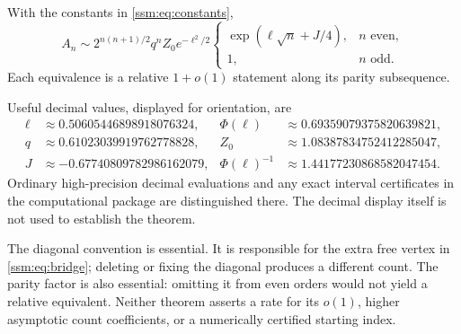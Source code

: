 \begin{theorem}\label{ssm:thm:matrix}
With the constants in \eqref{ssm:eq:constants},
\begin{equation}\label{ssm:eq:matrix}
 A_n\sim 2^{n(n+1)/2}q^n Z_0e^{-\ell^2/2}
 \begin{cases}
 \exp(\ell\sqrt n+J/4),&n\text{ even},\\
 1,&n\text{ odd}.
 \end{cases}
\end{equation}
Each equivalence is a relative $1+o(1)$ statement along its parity subsequence.
\end{theorem}

Useful decimal values, displayed for orientation, are
\[
\begin{array}{rlrl}
 \ell&\approx0.50605446898918076324,&\Phi(\ell)&\approx0.69359079375820639821,\\
 q&\approx0.61023039919762778828,&Z_0&\approx1.08387834752412285047,\\
 J&\approx-0.67740809782986162079,&\Phi(\ell)^{-1}&\approx1.44177230868582047454.
\end{array}
\]
Ordinary high-precision decimal evaluations and any exact interval certificates in the computational package are distinguished there. The decimal display itself is not used to establish the theorem.

The diagonal convention is essential. It is responsible for the extra free vertex in \eqref{ssm:eq:bridge}; deleting or fixing the diagonal produces a different count. The parity factor is also essential: omitting it from even orders would not yield a relative equivalent. Neither theorem asserts a rate for its $o(1)$, higher asymptotic count coefficients, or a numerically certified starting index.

